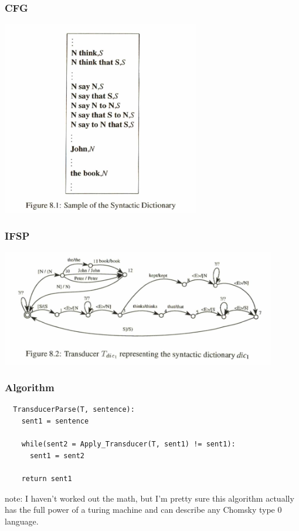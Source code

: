 \documentclass[10pt]{beamer}
\begin{document}
\begin{frame}[fragile]
  \frametitle{CFG}
  \centerline{\includegraphics[height=8.5cm]{fig81.png}}  
\end{frame}

\begin{frame}[fragile]
  \frametitle{IFSP}

  \centerline{\includegraphics[width=12cm]{fig82.png}}
  



\end{frame}

\begin{frame}[fragile]
  \frametitle{Algorithm}

  \begin{lstlisting}
  TransducerParse(T, sentence):
    sent1 = sentence

    while(sent2 = Apply_Transducer(T, sent1) != sent1):
      sent1 = sent2

    return sent1

  \end{lstlisting}

  note: I haven't worked out the math, but I'm pretty sure this algorithm actually has the full power of a turing machine and can describe any Chomsky type 0 language. 
\end{frame}
\end{document}
